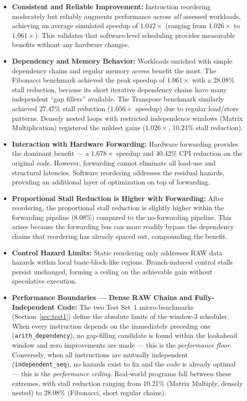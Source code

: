 \documentclass[11pt]{report}
\begin{document}
\begin{itemize}
    \item \textbf{Consistent and Reliable Improvement:} Instruction reordering moderately but reliably augments performance across \textit{all} assessed workloads, achieving an average simulated speedup of $1.042\times$ (ranging from $1.026\times$ to $1.061\times$). This validates that software-level scheduling provides measurable benefits without any hardware changes.

    \item \textbf{Dependency and Memory Behavior:} Workloads enriched with simple dependency chains and regular memory access benefit the most. The Fibonacci benchmark achieved the peak speedup of $1.061\times$ with a 28.08\% stall reduction, because its short iterative dependency chains have many independent ``gap fillers'' available. The Transpose benchmark similarly achieved 27.47\% stall reduction ($1.056\times$ speedup) due to regular load/store patterns. Densely nested loops with restricted independence windows (Matrix Multiplication) registered the mildest gains ($1.026\times$, 10.21\% stall reduction).

    \item \textbf{Interaction with Hardware Forwarding:} Hardware forwarding provides the dominant benefit --- a $1.678\times$ speedup and 40.42\% CPI reduction on the original code. However, forwarding cannot eliminate all load-use and structural latencies. Software reordering addresses the residual hazards, providing an additional layer of optimization on top of forwarding.

    \item \textbf{Proportional Stall Reduction is Higher with Forwarding:} After reordering, the proportional stall reduction is slightly higher within the forwarding pipeline (8.08\%) compared to the no-forwarding pipeline. This arises because the forwarding bus can more readily bypass the dependency chains that reordering has already spaced out, compounding the benefit.

    \item \textbf{Control Hazard Limits:} Static reordering only addresses RAW data hazards within local basic-block-like regions. Branch-induced control stalls persist unchanged, forming a ceiling on the achievable gain without speculative execution.

    \item \textbf{Performance Boundaries --- Dense RAW Chains and Fully-Independent Code:} The two Test Set~1 micro-benchmarks (Section~\ref{sec:test1}) define the absolute limits of the window-3 scheduler. When every instruction depends on the immediately preceding one (\texttt{arith\_dependency}), no gap-filling candidate is found within the lookahead window and zero improvements are made --- this is the \textit{performance floor}. Conversely, when all instructions are mutually independent (\texttt{independent\_seq}), no hazards exist to fix and the code is already optimal --- this is the \textit{performance ceiling}. Real-world programs fall between these extremes, with stall reduction ranging from 10.21\% (Matrix Multiply, densely nested) to 28.08\% (Fibonacci, short regular chains).


\end{itemize}
\end{document}
